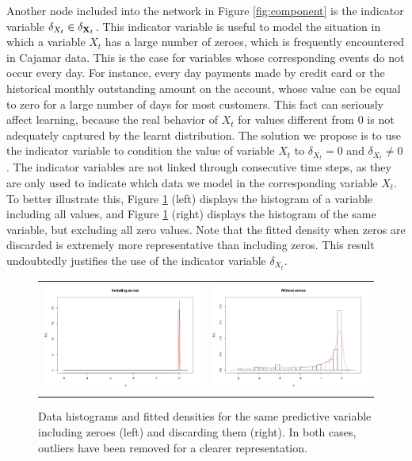 Another node included into the network in Figure \ref{fig:component} is the indicator variable $\delta_{X_t} \in \delta_{{\bf X}_t}$. This indicator variable is useful to model the situation in which a variable $X_t$ has a large number of zeroes, which is frequently encountered in Cajamar data. This is the case for variables whose corresponding events do not occur every day. For instance, every day payments made by credit card or the historical monthly outstanding amount on the account, whose value can be equal to zero for a large number of days for most customers. This fact can seriously affect learning, because the real behavior of $X_t$ for values different from 0 is not adequately captured by the learnt distribution.
The solution we propose is to use the indicator variable to condition the value of variable $X_t$ to $\delta_{X_t} = 0$ and $\delta_{X_t}\neq 0$. The indicator variables are not linked through consecutive time steps, as they are only used to indicate which data we model in the corresponding variable $X_t$. To better illustrate this, Figure \ref{fig:CajamarZeroes} (left) displays the histogram of a variable including all values, and Figure \ref{fig:CajamarZeroes} (right) displays the histogram of the same variable, but excluding all zero values. Note that the fitted density when zeros are discarded is extremely more representative than including zeros. This result undoubtedly justifies the use of the indicator variable $\delta_{X_t}$.

\begin{figure}[h]
  \centering
    \begin{tabular}{cc}    
       \includegraphics[width=70mm]{figures/with_zeroes}&
       \includegraphics[width=70mm]{figures/without_zeroes}
    \end{tabular}
    \caption{\label{fig:CajamarZeroes}Data histograms and fitted densities for the same predictive variable including zeroes (left) and discarding them (right). In both cases, outliers have been removed for a clearer representation.}

\end{figure}

